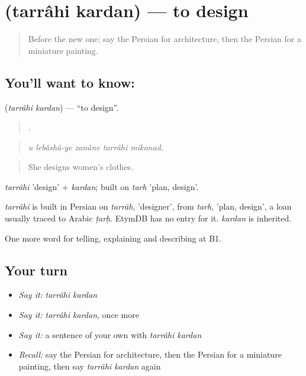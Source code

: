 \section[\texorpdfstring{\fa{طراحی} \fa{کردن} (tarrâhi kardan)}{طراحی کردن (tarrâhi kardan)}]{  (tarrâhi kardan) — to design}

\label{lesson:FA-C526-tarrahi-kardan}



\begin{quote}
Before the new one: say the Persian for architecture, then the Persian for a miniature painting.
\end{quote}

\subsection*{You'll want to know:  }
\textbf{ } (\emph{tarrâhi kardan}) — \textquotedblleft{}to design\textquotedblright{}.

\begin{quote}
    .
\end{quote}

\begin{quote}
\emph{u lebâshâ-ye zanâne tarrâhi mikonad.}
\end{quote}

\begin{quote}
She designs women's clothes.
\end{quote}

\emph{tarrâhi} 'design' + \emph{kardan}; built on \emph{tarh} 'plan, design'.

\begin{cousinweb}
\emph{tarrâhi} is built in Persian on \emph{tarrâh}, 'designer', from \emph{tarh}, 'plan, design', a loan usually traced to Arabic \emph{ṭarḥ}. EtymDB has no entry for it. \emph{kardan} is inherited.
\end{cousinweb}

\begin{grammarlens}[title={What you've built}]
One more word for telling, explaining and describing at B1.
\end{grammarlens}

\subsection*{Your turn}
\begin{itemize}
\raggedright
  \item \emph{Say it:} \emph{tarrâhi kardan}
  \item \emph{Say it:} \emph{tarrâhi kardan}, once more
  \item \emph{Say it:} a sentence of your own with \emph{tarrâhi kardan}
  \item \emph{Recall:} say the Persian for architecture, then the Persian for a miniature painting, then say \emph{tarrâhi kardan} again
\end{itemize}

